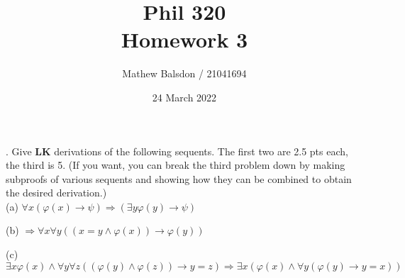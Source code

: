 \documentclass[11pt]{article}
\title{Phil 320\\Homework 3}
\author{Mathew Balsdon / 21041694}
\date{24 March 2022}%
\begin{document}
\maketitle

. Give $\textbf{LK}$ derivations of the following sequents. The first two are 2.5 pts each, the third is 5. (If you want, you can break the third problem down by making subproofs of various sequents and showing how they can be combined to obtain the desired derivation.) \\

(a) $\forall x(\varphi(x) \rightarrow \psi) \Rightarrow (\exists y \varphi(y) \rightarrow \psi)$ \\

\color{RoyalBlue}
\begin{prooftree}
\end{prooftree}
\color{black}

(b) $\Rightarrow \forall x \forall y ((x=y \wedge \varphi(x)) \rightarrow \varphi(y))$ \\

\color{RoyalBlue}
\begin{prooftree}
\end{prooftree}
\color{black}

(c) $\exists x \varphi(x) \wedge \forall y \forall z ((\varphi(y) \wedge \varphi(z)) \rightarrow y = z) \Rightarrow \exists x (\varphi(x) \wedge \forall y (\varphi(y) \rightarrow y = x))$ \\
\end{document}
